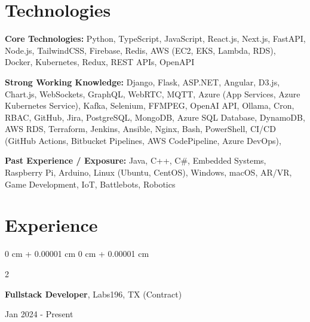 \documentclass[10pt, letterpaper]{article}
\newenvironment{onecolentry}{
    \begin{adjustwidth}{
        0 cm + 0.00001 cm
    }{
        0 cm + 0.00001 cm
    }
}{
    \end{adjustwidth}
} %
\newenvironment{twocolentry}[2][]{
    \onecolentry
    \def\secondColumn{#2}
    \setcolumnwidth{\fill, 4.5 cm}
    \begin{paracol}{2}
}{
    \switchcolumn \raggedleft \secondColumn
    \end{paracol}
    \endonecolentry
} %
\begin{document}



\section{Technologies}

\textbf{Core Technologies:}
Python, TypeScript, JavaScript,
React.js, Next.js, FastAPI, Node.js, TailwindCSS, Firebase, Redis,
AWS (EC2, EKS, Lambda, RDS), Docker, Kubernetes, Redux,
REST APIs, OpenAPI 

\vspace{0.251em}

\textbf{Strong Working Knowledge:}
Django, Flask, ASP.NET, Angular,
D3.js, Chart.js, WebSockets, GraphQL, WebRTC, MQTT,
Azure (App Services, Azure Kubernetes Service),
Kafka, Selenium, FFMPEG, OpenAI API, Ollama,
Cron, RBAC, GitHub, Jira, PostgreSQL, MongoDB, Azure SQL Database, DynamoDB, AWS RDS,
Terraform, Jenkins, Ansible, Nginx, Bash, PowerShell,
CI/CD (GitHub Actions, Bitbucket Pipelines, AWS CodePipeline, Azure DevOps),

\vspace{0.25em}

\textbf{Past Experience / Exposure:}
Java, C++, C\#, Embedded Systems, Raspberry Pi, Arduino,
Linux (Ubuntu, CentOS), Windows, macOS, AR/VR, Game Development, IoT, Battlebots, Robotics



\section{Experience}

\begin{twocolentry}{
	Jan 2024 - Present
}
\textbf{Fullstack Developer}, Labs196, TX (Contract)
\end{twocolentry}
\end{document}

